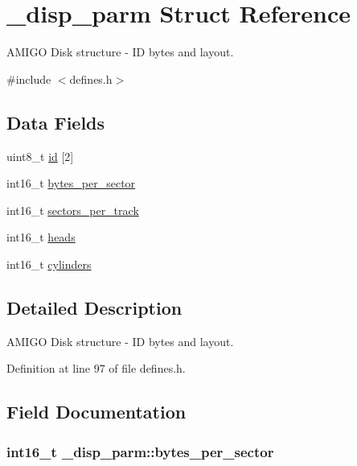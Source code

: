 \hypertarget{struct__disp__parm}{\section{\-\_\-disp\-\_\-parm Struct Reference}
\label{struct__disp__parm}
}


A\-M\-I\-G\-O Disk structure -\/ I\-D bytes and layout.  




{\ttfamily \#include $<$defines.\-h$>$}

\subsection*{Data Fields}
\begin{DoxyCompactItemize}
\item 
uint8\-\_\-t \hyperlink{struct__disp__parm_adc781d8c48b2aa39c092fcb206f15e8c}{id} \mbox{[}2\mbox{]}
\item 
int16\-\_\-t \hyperlink{struct__disp__parm_ad575790e79a6bdf19bffcb8dda1df180}{bytes\-\_\-per\-\_\-sector}
\item 
int16\-\_\-t \hyperlink{struct__disp__parm_a870887d0582245d0c35f34724180463c}{sectors\-\_\-per\-\_\-track}
\item 
int16\-\_\-t \hyperlink{struct__disp__parm_a013e3f25cec51e3edfae124ed5d22cb9}{heads}
\item 
int16\-\_\-t \hyperlink{struct__disp__parm_ac4687d407f95a65e86313cde433832a4}{cylinders}
\end{DoxyCompactItemize}


\subsection{Detailed Description}
A\-M\-I\-G\-O Disk structure -\/ I\-D bytes and layout. 

Definition at line 97 of file defines.\-h.



\subsection{Field Documentation}
\hypertarget{struct__disp__parm_ad575790e79a6bdf19bffcb8dda1df180}{
\subsubsection[{bytes\-\_\-per\-\_\-sector}]{\setlength{\rightskip}{0pt plus 5cm}int16\-\_\-t \-\_\-disp\-\_\-parm\-::bytes\-\_\-per\-\_\-sector}}\label{struct__disp__parm_ad575790e79a6bdf19bffcb8dda1df180}


